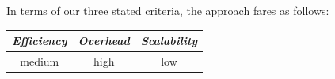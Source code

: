 %
%
%
%
%
%
In terms of our three stated criteria, the approach fares as follows:
\begin{center}
{\footnotesize
\begin{tabular}{ccc}
\emph{Efficiency} & \emph{Overhead} & \emph{Scalability} \\
\hline
medium &
high &
low
\end{tabular}
}
\end{center}


